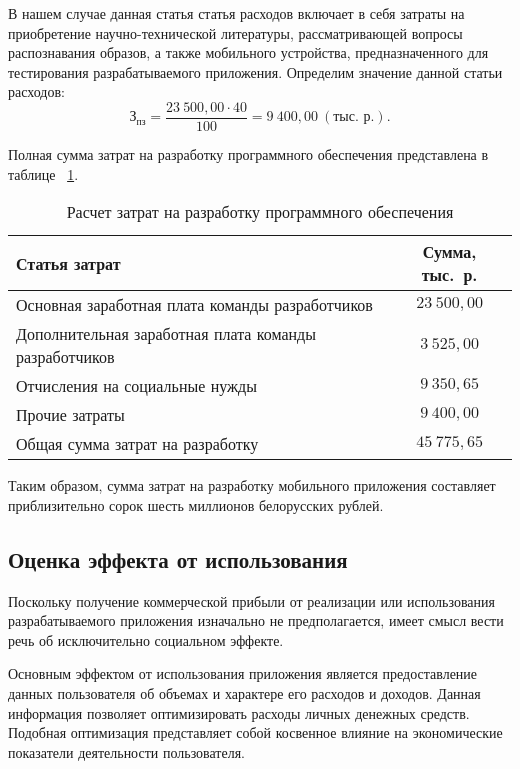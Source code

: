 В нашем случае данная статья статья расходов включает в себя затраты на приобретение
научно-технической литературы, рассматривающей вопросы распознавания образов,
а также мобильного устройства, предназначенного
для тестирования разрабатываемого приложения.
Определим значение данной статьи расходов:
\begin{equation}
  \text{З}_{\text{пз}} =
  \dfrac{23 \: 500{,}00 \cdot 40}{100} = 9 \: 400{,}00 \: (\text{тыс.~р.}).
\end{equation}

Полная сумма затрат на разработку программного обеспечения представлена в таблице
~\ref{tbl:teo_sum_cost}.

\begin{table} [h!]
  \caption{
    Расчет затрат на разработку программного обеспечения
  }\label{tbl:teo_sum_cost}
  \begin{tabular}{| m{13.5cm} | c |}
    \hline

    \parbox{13.5cm}{
    \smallskip
    \centering Статья затрат
    \smallskip
    }
    &
      \parbox{2cm}{
      \smallskip
      \centering Сумма, тыс.~р.
    \smallskip
    } \\
    \hline

    Основная заработная плата команды разработчиков
    & \( 23 \: 500{,}00 \)\\
    \hline

    Дополнительная заработная плата команды разработчиков
    & \( 3 \: 525{,}00 \)\\
    \hline

    Отчисления на социальные нужды
    & \( 9 \: 350{,}65 \)\\
    \hline

    Прочие затраты
    & \( 9 \: 400{,}00 \)\\
    \hline

    Общая сумма затрат на разработку
    & \( 45 \: 775{,}65 \) \\
    \hline
  \end{tabular}
\end{table}
\vspace{-2.5mm}

Таким образом, сумма затрат на разработку мобильного приложения
составляет приблизительно сорок шесть миллионов белорусских рублей.

\subsection{Оценка эффекта от использования}

Поскольку получение коммерческой прибыли от реализации или использования
разрабатываемого приложения изначально не предполагается,
имеет смысл вести речь об исключительно социальном эффекте.

Основным эффектом от использования приложения является
предоставление данных пользователя об объемах и характере
его расходов и доходов. Данная информация
позволяет оптимизировать расходы личных денежных средств.
Подобная оптимизация представляет собой косвенное влияние
на экономические показатели деятельности пользователя.